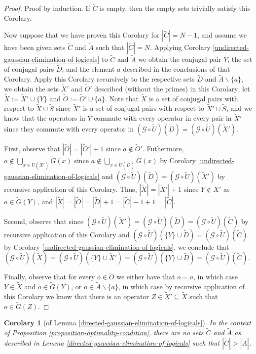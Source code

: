 \documentclass[twocolumn,showpacs,preprintnumbers,amsmath,amssymb,nofootinbib,pra,floatfix]{revtex4-1}
\newtheorem{corolary}{Corolary}
\newcommand{\set}{\tilde}
\newcommand{\genfun}{\mathcal{G}}
\begin{document}
\begin{proof}
Proof by induction.  If $\set C$ is empty, then the empty sets trivially satisfy this Corolary.

Now suppose that we have proven this Corolary for $|\set C|=N-1$, and assume we have been given sets $\set C$ and $\set A$ such that $|\set C|=N$.  Applying Corolary \ref{undirected-gaussian-elimination-of-logicals} to $\set C$ and $\set A$ we obtain the conjugal pair $Y$,  the set of conjugal pairs $\set D$, and the element $a$ described in the conclusions of that Corolary.  Apply this Corolary recursively to the respective sets $\set D$ and $\set A\backslash\{a\}$, we obtain the sets $\set X'$ and $\set O'$ described (without the primes) in this Corolary; let $\set X := \set X'\cup\{Y\}$ and $\set O:=\set O'\cup\{a\}$.  Note that $\set X$ is a set of conjugal pairs with respect to $\set X\cup\set S$ since $\set X'$ is a set of conjugal pairs with respect to $\set X'\cup\set S$, and we know that the operators in $Y$ commute with every operator in every pair in $\set X'$ since they commute with every operator in $(\genfun\circ\set U)(\set D)=(\genfun\circ\set U)(\set X')$.

First, observe that $|\set O|=|\set O'|+1$ since $a\notin \set O'$.  Futhermore, $a\notin \bigcup_{x\in \set U(\set X')} \set G(x)$ since $a\notin \bigcup_{x\in \set U(\set D)} \set G(x)$ by Corolary \ref{undirected-gaussian-elimination-of-logicals} and $(\genfun\circ\set U)(\set D)=(\genfun\circ\set U)(\set X')$ by recursive application of this Corolary.  Thus, $|\set X|=|\set X'|+1$ since $Y\notin X'$ as $a\in\set G(Y)$, and $|\set X|=|\set O|=|\set D|+1=|\set C|-1+1=|\set C|$.

Second, observe that since $(\genfun\circ\set U)(\set X')=(\genfun\circ\set U)(\set D)=(\genfun\circ\set U)(\set C)$ by recursive application of this Corolary and $(\genfun\circ\set U)(\{Y\}\cup\set D)=(\genfun\circ\set U)(\set C)$ by Corolary \ref{undirected-gaussian-elimination-of-logicals}, we conclude that $(\genfun\circ\set U)(\set X) = (\genfun\circ\set U)(\{Y\}\cup\set X') = (\genfun\circ\set U)(\{Y\}\cup\set D) = (\genfun\circ\set U)(\set C)$.

Finally, observe that for every $o\in\set O$ we either have that $o=a$, in which case $Y\in\set X$ and $o\in\set G(Y)$, or $o\in \set A\backslash\{a\}$, in which case by recursive application of this Corolary we know that there is an operator $Z\in \set X'\subseteq \set X$ such that $o\in\set G(Z)$.
\end{proof}
\begin{corolary}[of Lemma \ref{directed-gaussian-elimination-of-logicals}]
In the context of Proposition \ref{proposition-optimality-condition}, there are no sets $\set C$ and $\set A$ as described in Lemma \ref{directed-gaussian-elimination-of-logicals} such that $|\set C|>|\set A|$.
\end{corolary}
\end{document}
